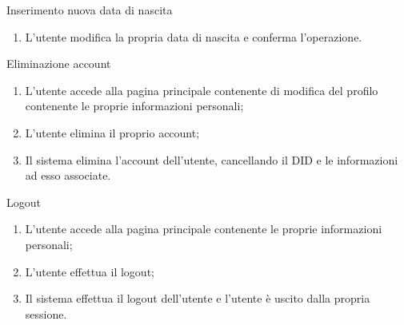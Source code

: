 \begin{usecase}{12.3}{Inserimento nuova data di nascita}\label{uc:modifica-data-nascita}
  \usecasemain{}
  
  \begin{enumerate}
    \item L'utente modifica la propria data di nascita e conferma l'operazione.
  \end{enumerate}
  
\end{usecase}

\begin{usecase}{13}{Eliminazione account}\label{uc:eliminazione-account}
  \usecasemain{}
  
  \begin{enumerate}
    \item L'utente accede alla pagina principale contenente di modifica del profilo contenente le proprie informazioni personali;
    \item L'utente elimina il proprio account;
    \item Il sistema elimina l'account dell'utente, cancellando il DID e le informazioni ad esso associate.
  \end{enumerate}
\end{usecase}

\begin{usecase}{14}{Logout}\label{uc:logout}
  \usecasemain{}
  
  \begin{enumerate}
    \item L'utente accede alla pagina principale contenente le proprie informazioni personali;
    \item L'utente effettua il logout;
    \item Il sistema effettua il logout dell'utente e l'utente è uscito dalla propria sessione.
  \end{enumerate}
\end{usecase}


